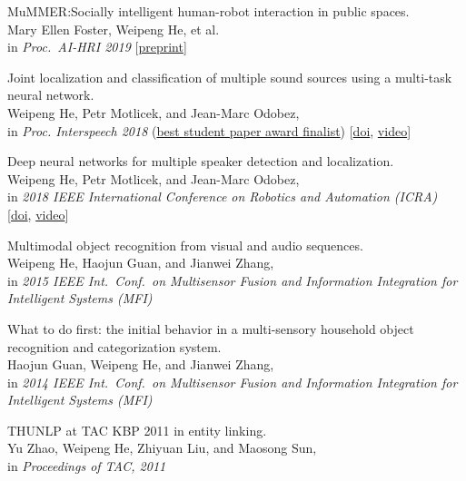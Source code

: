 \documentclass[a4paper,9pt]{extarticle} %
\begin{document}
\begin{enumerate}[label={[\arabic*]}]
  \item MuMMER:\@ Socially intelligent human-robot interaction in public spaces. \\
        Mary Ellen Foster, Weipeng He, et al. \\
        in \textit{Proc.\ AI-HRI 2019}
        [\href{https://arxiv.org/abs/1909.06749}{preprint}]

  \item Joint localization and classification of multiple sound sources using a multi-task neural network. \\
        Weipeng He, Petr Motlicek, and Jean-Marc Odobez, \\
        in \textit{Proc. Interspeech 2018}
        (\ul{best student paper award finalist})
        [\href{http://doi.org/10.21437/Interspeech.2018-1269}{doi}, \href{https://www.youtube.com/watch?v=O7bQvg03RTc}{video}]

  \item Deep neural networks for multiple speaker detection and localization. \\
        Weipeng He, Petr Motlicek, and Jean-Marc Odobez, \\
        in \textit{2018 IEEE International Conference on Robotics and Automation (ICRA)}
        [\href{http://doi.org/10.1109/ICRA.2018.8461267}{doi}, \href{https://www.youtube.com/watch?v=_4EwuVlE_pU}{video}]

  \item Multimodal object recognition from visual and audio sequences. \\
        Weipeng He, Haojun Guan, and Jianwei Zhang, \\
        in \textit{2015 IEEE Int.\ Conf.\ on Multisensor Fusion and Information Integration for Intelligent Systems (MFI)}

  \item What to do first: the initial behavior in a multi-sensory household object recognition and categorization system. \\
        Haojun Guan, Weipeng He, and Jianwei Zhang, \\
        in \textit{2014 IEEE Int.\ Conf.\ on Multisensor Fusion and Information Integration for Intelligent Systems (MFI)}

  \item THUNLP at TAC KBP 2011 in entity linking. \\
        Yu Zhao, Weipeng He, Zhiyuan Liu, and Maosong Sun, \\
        in \textit{Proceedings of TAC, 2011}
\end{enumerate}
\end{document}
